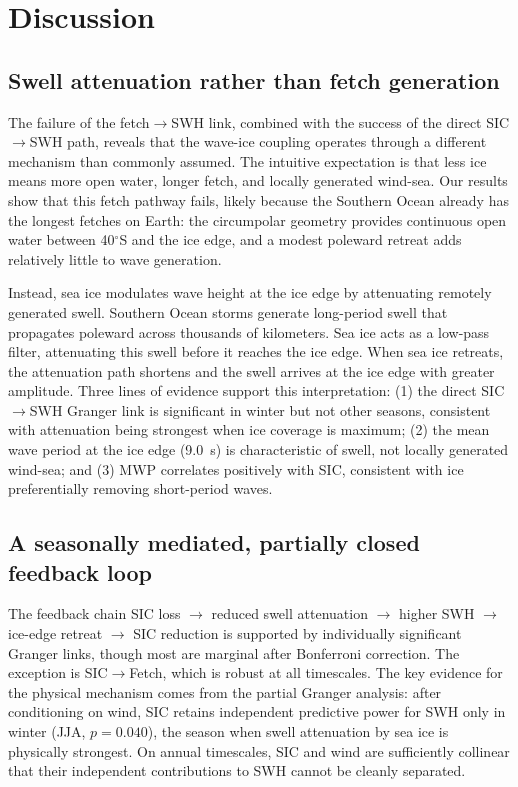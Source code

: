 \documentclass[11pt]{article}
\begin{document}
\section{Discussion}
\label{sec:discussion}

\subsection{Swell attenuation rather than fetch generation}

The failure of the fetch$\to$SWH link, combined with the success of the direct SIC$\to$SWH path, reveals that the wave-ice coupling operates through a different mechanism than commonly assumed. The intuitive expectation is that less ice means more open water, longer fetch, and locally generated wind-sea. Our results show that this fetch pathway fails, likely because the Southern Ocean already has the longest fetches on Earth: the circumpolar geometry provides continuous open water between 40$^\circ$S and the ice edge, and a modest poleward retreat adds relatively little to wave generation.

Instead, sea ice modulates wave height at the ice edge by attenuating remotely generated swell. Southern Ocean storms generate long-period swell that propagates poleward across thousands of kilometers\cite{Kohout2014}. Sea ice acts as a low-pass filter, attenuating this swell before it reaches the ice edge\cite{Squire2020}. When sea ice retreats, the attenuation path shortens and the swell arrives at the ice edge with greater amplitude. Three lines of evidence support this interpretation: (1) the direct SIC$\to$SWH Granger link is significant in winter but not other seasons, consistent with attenuation being strongest when ice coverage is maximum; (2) the mean wave period at the ice edge (9.0~s) is characteristic of swell, not locally generated wind-sea; and (3) MWP correlates positively with SIC, consistent with ice preferentially removing short-period waves.

\subsection{A seasonally mediated, partially closed feedback loop}

The feedback chain SIC loss $\to$ reduced swell attenuation $\to$ higher SWH $\to$ ice-edge retreat $\to$ SIC reduction is supported by individually significant Granger links, though most are marginal after Bonferroni correction. The exception is SIC$\to$Fetch, which is robust at all timescales. The key evidence for the physical mechanism comes from the partial Granger analysis: after conditioning on wind, SIC retains independent predictive power for SWH only in winter (JJA, $p = 0.040$), the season when swell attenuation by sea ice is physically strongest. On annual timescales, SIC and wind are sufficiently collinear that their independent contributions to SWH cannot be cleanly separated.
\end{document}
